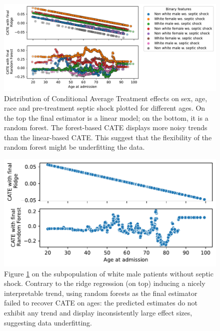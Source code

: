 \documentclass[french,12pt,twoside,a4paper]{book}
\begin{document}
\begin{appendices}
  \begin{figure}
    \centering
    \includegraphics[width=\linewidth]{img/chapter_4/cate_age_forest_failure_all_category__est__DML__nuisances__Forests__final_RandomForestRegressor.pdf}
    \caption{Distribution of Conditional Average Treatment effects on sex, age,
      race and pre-treatment septic shock plotted for different ages. On the top
      the final estimator is a linear model; on the bottom, it is a random
      forest. The forest-based CATE displays more noisy trends than the
      linear-based CATE. This suggest that the flexibility of the random forest
      might be underfitting the data.}\label{apd:fig:albumin_for_sepsis:cate_age_forest_failure}
  \end{figure}

  \begin{figure}
    \centering
    \includegraphics[width=\linewidth]{img/chapter_4/cate_age_forest_failure_w1_f0_shock0_est__DML__nuisances__Forests__final_RandomForestRegressor.pdf}
    \caption{Figure \ref{apd:fig:albumin_for_sepsis:cate_age_forest_failure} on
      the subpopulation of white male patients without septic shock. Contrary to
      the ridge regression (on top) inducing a nicely interpretable trend, using
      random forests as the final estimator failed to recover CATE on ages: the
      predicted estimates do not exhibit any trend and display inconsistently
      large effect sizes, suggesting data underfitting.
    }\label{apd:fig:albumin_for_sepsis:cate_failure}
  \end{figure}


\end{appendices}
\end{document}
